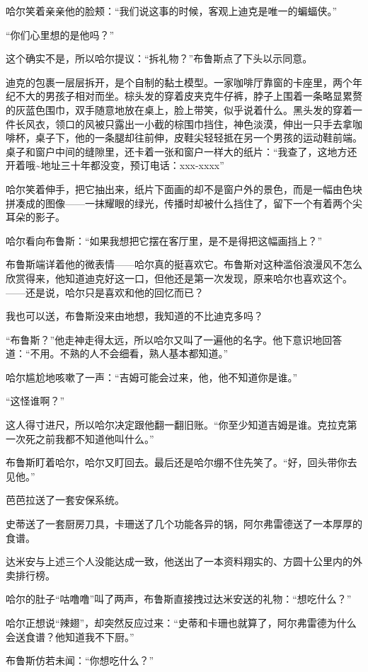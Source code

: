 \documentclass[../main]{subfiles}
\begin{document}
哈尔笑着亲亲他的脸颊：“我们说这事的时候，客观上迪克是唯一的蝙蝠侠。”

“你们心里想的是他吗？”

这个确实不是，所以哈尔提议：“拆礼物？”布鲁斯点了下头以示同意。

迪克的包裹一层层拆开，是个自制的黏土模型。一家咖啡厅靠窗的卡座里，两个年纪不大的男孩子相对而坐。棕头发的穿着皮夹克牛仔裤，脖子上围着一条略显累赘的灰蓝色围巾，双手随意地放在桌上，脸上带笑，似乎说着什么。黑头发的穿着一件长风衣，领口的风被只露出一小截的棕围巾挡住，神色淡漠，伸出一只手去拿咖啡杯，桌子下，他的一条腿却往前伸，皮鞋尖轻轻抵在另一个男孩的运动鞋前端。桌子和窗户中间的缝隙里，还卡着一张和窗户一样大的纸片：“我查了，这地方还开着哦\textasciitilde 地址三十年都没变，预订电话：xxx-xxxx”

哈尔笑着伸手，把它抽出来，纸片下面画的却不是窗户外的景色，而是一幅由色块拼凑成的图像——一抹耀眼的绿光，传播时却被什么挡住了，留下一个有着两个尖耳朵的影子。

哈尔看向布鲁斯：“如果我想把它摆在客厅里，是不是得把这幅画挡上？”

布鲁斯端详着他的微表情——哈尔真的挺喜欢它。布鲁斯对这种滥俗浪漫风不怎么欣赏得来，他知道迪克好这一口，但他还是第一次发现，原来哈尔也喜欢这个。——还是说，哈尔只是喜欢和他的回忆而已？

我也可以送，布鲁斯没来由地想，我知道的不比迪克多吗？

“布鲁斯？”他走神走得太远，所以哈尔又叫了一遍他的名字。他下意识地回答道：“不用。不熟的人不会细看，熟人基本都知道。”

哈尔尴尬地咳嗽了一声：“吉姆可能会过来，他，他不知道你是谁。”

“这怪谁啊？”

这人得寸进尺，所以哈尔决定跟他翻一翻旧账。“你至少知道吉姆是谁。克拉克第一次死之前我都不知道他叫什么。”

布鲁斯盯着哈尔，哈尔又盯回去。最后还是哈尔绷不住先笑了。“好，回头带你去见他。”

芭芭拉送了一套安保系统。

史蒂送了一套厨房刀具，卡珊送了几个功能各异的锅，阿尔弗雷德送了一本厚厚的食谱。

达米安与上述三个人没能达成一致，他送出了一本资料翔实的、方圆十公里内的外卖排行榜。

哈尔的肚子“咕噜噜”叫了两声，布鲁斯直接拽过达米安送的礼物：“想吃什么？”

哈尔正想说“辣翅”，却突然反应过来：“史蒂和卡珊也就算了，阿尔弗雷德为什么会送食谱？他知道我不下厨。”

布鲁斯仿若未闻：“你想吃什么？”
\end{document}
